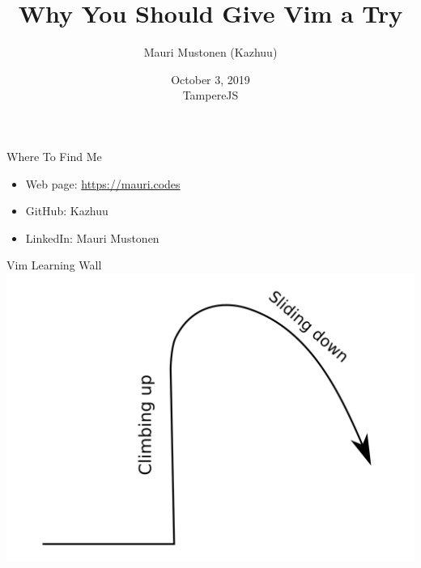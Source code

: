 \documentclass{beamer}
\title{Why You Should Give Vim a Try}
\author{Mauri Mustonen (Kazhuu)}
\date{October 3, 2019 \\ TampereJS}
\begin{document}
\maketitle

\begin{frame}{Where To Find Me}
    \begin{itemize}
        \item Web page: \url{https://mauri.codes}
        \item GitHub: Kazhuu
        \item LinkedIn: Mauri Mustonen
    \end{itemize}
\end{frame}
\usebackgroundtemplate{}

\begin{frame}{Vim Learning Wall}
    \includegraphics[width=1\textwidth]{images/vim-learning-curve.png}
\end{frame}
\end{document}

